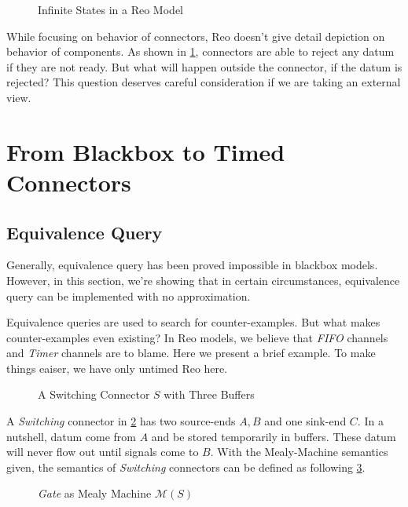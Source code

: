 \documentclass[conference, a4paper]{IEEEtran}
\begin{document}
\begin{figure}[h]
\caption{Infinite States in a Reo Model}
\label{fig:reoinfinite}
\end{figure}

While focusing on behavior of connectors, Reo doesn't give detail depiction on behavior of
components. As shown in \figurename \ref{fig:reoinfinite}, connectors are able to reject any datum
if they are not ready. But what will happen outside the connector, if the datum is rejected? This
question deserves careful consideration if we are taking an external view.

\section{From Blackbox to Timed Connectors}
\subsection{Equivalence Query}
Generally, equivalence query has been proved impossible in blackbox
models\cite{DBLP:journals/iandc/Angluin87}. However, in this
section, we're showing that in certain circumstances, equivalence query can be implemented with
no approximation.

Equivalence queries are used to search for counter-examples. But what makes counter-examples even
existing? In Reo models, we believe that \emph{FIFO} channels and \emph{Timer} channels are to
blame. Here we present a brief example. To make things eaiser, we have only untimed Reo here.

\begin{figure}[h]
  \begin{center}
    
  \end{center}
  \caption{A Switching Connector $S$ with Three Buffers}
  \label{fig:buf3}
\end{figure}

A \emph{Switching} connector in \figurename \ref{fig:buf3} has two source-ends $A,B$ and one
sink-end $C$. In a nutshell, datum come from $A$ and be stored temporarily in buffers. These datum
will never flow out until signals come to $B$. With the Mealy-Machine semantics given, the semantics
of \emph{Switching} connectors can be defined as following \figurename \ref{fig:buf3semantics}.

\begin{figure}[h]
  \begin{center}
    
  \end{center}
  \caption{\emph{Gate} as Mealy Machine $\mathcal{M}(S)$}
  \label{fig:buf3semantics}
\end{figure}
\end{document}
